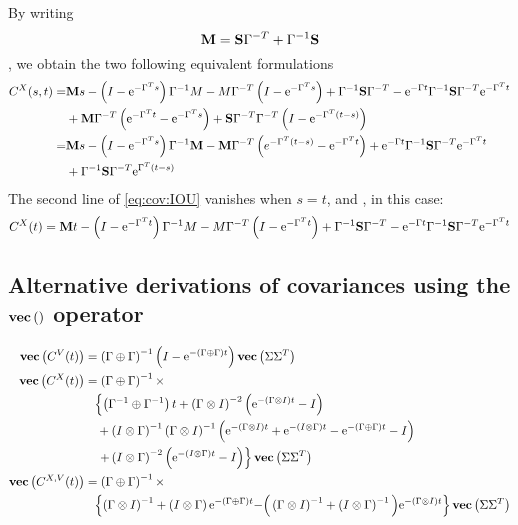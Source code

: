 By writing 
$$\mathbf{M} = \mathbf{S}\Gamma^{-T} + \Gamma^{-1}\mathbf{S}$$, we obtain the two following equivalent formulations
\begin{align}
 C^X(s,t)  =&\mathbf{M} s - \left(I - \text{e}^{-\Gamma^T s}\right)\Gamma^{-1} M - M\Gamma^{-T}\left(I - \text{e}^{-\Gamma^T s}\right)+ \Gamma^{-1} \mathbf{S} \Gamma^{-T} - 
   \text{e}^{-\Gamma t}\Gamma^{-1}\mathbf{S}\Gamma^{-T}\text{e}^{-\Gamma^T t} \nonumber \\
   &+
   \mathbf{M}\Gamma^{-T}\left(\text{e}^{-\Gamma^T t} - \text{e}^{-\Gamma^T s} \right) 
   + \mathbf{S}\Gamma^{-T}\Gamma^{-T}\left(I - \text{e}^{-\Gamma^T(t -s)} \right) \label{eq:cov:IOU}\\
   = &\mathbf{M} s - \left(I - \text{e}^{-\Gamma^T s}\right)\Gamma^{-1} \mathbf{M} - \mathbf{M}\Gamma^{-T}\left(e^{-\Gamma^T (t-s)} - \text{e}^{-\Gamma^T t}\right)+
   \text{e}^{-\Gamma t}\Gamma^{-1}\mathbf{S}\Gamma^{-T}\text{e}^{-\Gamma^T t} \nonumber \\
   &+ \Gamma^{-1}\mathbf{S}\Gamma^{-T}\text{e}^{\Gamma^T(t - s)} \label{eq:cov:IOU:bis}
\end{align}
The second line of \eqref{eq:cov:IOU} vanishes when $s = t$, and , in this case:
$$C^X(t) = \mathbf{M} t - \left(I - \text{e}^{-\Gamma^T t}\right)\Gamma^{-1} M - M\Gamma^{-T}\left(I - \text{e}^{-\Gamma^T t}\right)+ \Gamma^{-1} \mathbf{S} \Gamma^{-T} - 
   \text{e}^{-\Gamma t}\Gamma^{-1}\mathbf{S}\Gamma^{-T}\text{e}^{-\Gamma^T t}$$

\subsection{Alternative derivations of covariances using the $\textbf{vec}\left(\hbox{} \right)$ operator}

\begin{align}
\textbf{vec}\left(C^V (t) \right) &= \left( \Gamma \oplus \Gamma \right)^{-1} \left(I - \text{e}^{-(\Gamma  \oplus \Gamma) t} \right) \textbf{vec}\left(\Sigma \Sigma^T \right) \label{eq:CX}\\
\textbf{vec}\left(C^X(t) \right) &= \left( \Gamma \oplus \Gamma \right)^{-1} \times \nonumber\\
&~~\left\lbrace   \left(\Gamma^{-1} \oplus \Gamma^{-1} \right)t + \left(\Gamma \otimes I \right)^{-2}\left(\text{e}^{-\left(\Gamma \otimes I \right) t}  - I \right)\right. \nonumber\\
&~~~ + \left(I \otimes \Gamma \right)^{-1}\left(\Gamma \otimes I \right)^{-1}\left(\text{e}^{-\left(\Gamma \otimes I \right) t} + \text{e}^{-\left(I \otimes \Gamma \right) t} - \text{e}^{-\left( \Gamma \oplus \Gamma \right) t} - I \right)\nonumber \\
&~~~\left. + \left(I \otimes \Gamma \right)^{-2} \left(\text{e}^{-\left(I \otimes \Gamma \right) t}  - I \right)\right\rbrace\textbf{vec}\left(\Sigma\Sigma^T \right)\label{eq:CV}\\
\textbf{vec}\left(C^{X,V}(t) \right)&= \left( \Gamma \oplus \Gamma \right)^{-1}\times \nonumber\\ 
&~~ \left\lbrace \left(\Gamma \otimes I \right)^{-1} + \left(I \otimes \Gamma \right) \text{e}^{- \left( \Gamma \oplus \Gamma \right) t} - \right( \left(\Gamma \otimes I \right)^{-1} + \left(I \otimes \Gamma \right)^{-1} \left)\text{e}^{-\left(\Gamma \otimes I \right) t}\right\rbrace \textbf{vec}\left(\Sigma\Sigma^T \right)\label{eq:CVX}
\end{align}

